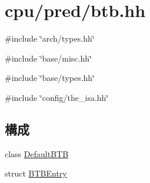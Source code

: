 \hypertarget{btb_8hh}{
\section{cpu/pred/btb.hh}
\label{btb_8hh}
}
{\ttfamily \#include \char`\"{}arch/types.hh\char`\"{}}\par
{\ttfamily \#include \char`\"{}base/misc.hh\char`\"{}}\par
{\ttfamily \#include \char`\"{}base/types.hh\char`\"{}}\par
{\ttfamily \#include \char`\"{}config/the\_\-isa.hh\char`\"{}}\par
\subsection*{構成}
\begin{DoxyCompactItemize}
\item 
class \hyperlink{classDefaultBTB}{DefaultBTB}
\item 
struct \hyperlink{structDefaultBTB_1_1BTBEntry}{BTBEntry}
\end{DoxyCompactItemize}
